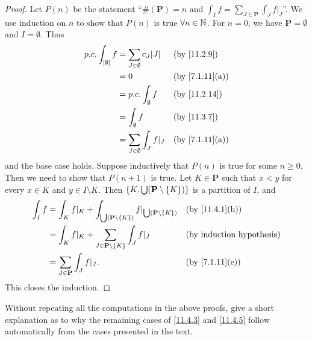 \begin{proof}
  Let \(P(n)\) be the statement ``\(\#(\mathbf{P}) = n\) and \(\int_I f = \sum_{J \in \mathbf{P}} \int_J f|_J\)''.
  We use induction on \(n\) to show that \(P(n)\) is true \(\forall n \in \mathbb{N}\).
  For \(n = 0\), we have \(\mathbf{P} = \emptyset\) and \(I = \emptyset\).
  Thus
  \begin{align*}
    p.c. \int_{[\emptyset]} f & = \sum_{J \in \emptyset} c_J \abs{J} &  & \by{11.2.9}    \\
                              & = 0                                  &  & \by{7.1.11}[a] \\
                              & = p.c. \int_{\emptyset} f            &  & \by{11.2.14}   \\
                              & = \int_{\emptyset} f                 &  & \by{11.3.7}    \\
                              & = \sum_{J \in \emptyset} \int_J f|_J &  & \by{7.1.11}[a]
  \end{align*}
  and the base case holds.
  Suppose inductively that \(P(n)\) is true for some \(n \geq 0\).
  Then we need to show that \(P(n + 1)\) is true.
  Let \(K \in \mathbf{P}\) such that \(x < y\) for every \(x \in K\) and \(y \in I \setminus K\).
  Then \(\left\lbrace K, \bigcup (\mathbf{P} \setminus \left\lbrace K\right\rbrace)\right\rbrace\) is a partition of \(I\), and
  \begin{align*}
    \int_I f & = \int_K f|_K + \int_{\bigcup (\mathbf{P} \setminus \set{K})} f|_{\bigcup (\mathbf{P} \setminus \set{K})} &  & \by{11.4.1}[h] \\
             & = \int_K f|_K + \sum_{J \in \mathbf{P} \setminus \set{K}} \int_J f|_J                                     &  & \byIH          \\
             & = \sum_{J \in \mathbf{P}} \int_J f|_J.                                                                    &  & \by{7.1.11}[e]
  \end{align*}
  This closes the induction.
\end{proof}

\begin{ex}\label{ex:11.4.4}
  Without repeating all the computations in the above proofs, give a short explanation as to why the remaining cases of \cref{11.4.3} and \cref{11.4.5} follow automatically from the cases presented in the text.
\end{ex}

